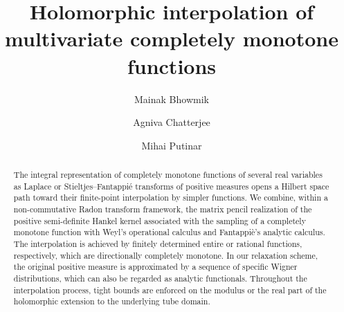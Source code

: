 \documentclass[11pt,reqno]{amsart}
\theoremstyle{plain}
\theoremstyle{definition}
\numberwithin{equation}{section}
\begin{document}
	\title[Completely monotone functions] {Holomorphic interpolation of multivariate completely monotone functions}
    
	\author[M. Bhowmik]{Mainak Bhowmik }
	\address{Indian Institute of Technology, Bombay, India }
	
	\author[A. Chatterjee]{Agniva Chatterjee}
	\address{Indian Institute of Technology Palakkad, Palakkad, Kerala, India }
	
	

	\author[M. Putinar]{Mihai Putinar}
	\address{University of California at Santa Barbara, CA} 
	
	
	
	
	
	
	\begin{abstract}  
    The integral representation of completely monotone functions of several real variables as Laplace or Stieltjes–Fantappié transforms of positive measures opens a Hilbert space path toward their finite-point interpolation by simpler functions. We combine, within a non-commutative Radon transform framework, the matrix pencil realization of the positive semi-definite Hankel kernel associated with the sampling of a completely monotone function with Weyl’s operational calculus and Fantappi\`e's analytic calculus. The interpolation is achieved by finitely determined entire or rational functions, respectively, which are directionally completely monotone. In our relaxation scheme, the original positive measure is approximated by a sequence of specific Wigner distributions, which can also be regarded as analytic functionals. Throughout the interpolation process, tight bounds are enforced on the modulus or the real part of the holomorphic extension to the underlying tube domain.	
	\end{abstract}
	
	\maketitle
    \tableofcontents
	
\end{document}
